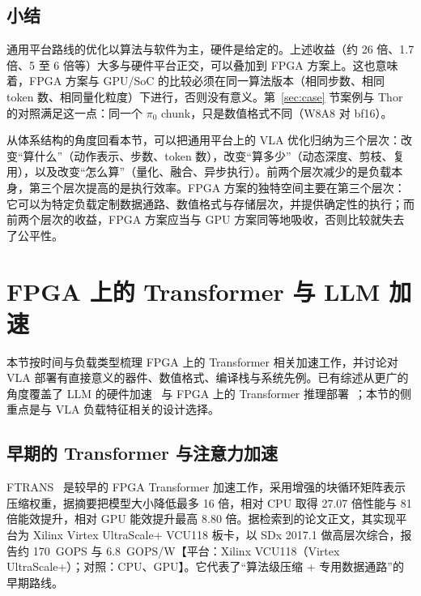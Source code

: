 \documentclass[a4paper,10.5pt]{ctexart}
\newcommand{\pizero}{$\pi_0$}
\newcommand{\hw}[1]{\textsf{【平台：#1】}}
\begin{document}
\subsection{小结}

通用平台路线的优化以算法与软件为主，硬件是给定的。上述收益（约 26 倍、1.7 倍、5 至 6 倍等）大多与硬件平台正交，可以叠加到 FPGA 方案上。这也意味着，FPGA 方案与 GPU/SoC 的比较必须在同一算法版本（相同步数、相同 token 数、相同量化粒度）下进行，否则没有意义。第~\ref{sec:case} 节案例与 Thor 的对照满足这一点：同一个 \pizero{} chunk，只是数值格式不同（W8A8 对 bf16）。

从体系结构的角度回看本节，可以把通用平台上的 VLA 优化归纳为三个层次：改变“算什么”（动作表示、步数、token 数），改变“算多少”（动态深度、剪枝、复用），以及改变“怎么算”（量化、融合、异步执行）。前两个层次减少的是负载本身，第三个层次提高的是执行效率。FPGA 方案的独特空间主要在第三个层次：它可以为特定负载定制数据通路、数值格式与存储层次，并提供确定性的执行；而前两个层次的收益，FPGA 方案应当与 GPU 方案同等地吸收，否则比较就失去了公平性。

\section{FPGA 上的 Transformer 与 LLM 加速}\label{sec:fpga}

本节按时间与负载类型梳理 FPGA 上的 Transformer 相关加速工作，并讨论对 VLA 部署有直接意义的器件、数值格式、编译栈与系统先例。已有综述从更广的角度覆盖了 LLM 的硬件加速~\cite{survey_llmhw,survey_llmhw2} 与 FPGA 上的 Transformer 推理部署~\cite{survey_fpga_tf}；本节的侧重点是与 VLA 负载特征相关的设计选择。

\subsection{早期的 Transformer 与注意力加速}

FTRANS~\cite{ftrans} 是较早的 FPGA Transformer 加速工作，采用增强的块循环矩阵表示压缩权重，据摘要把模型大小降低最多 16 倍，相对 CPU 取得 27.07 倍性能与 81 倍能效提升，相对 GPU 能效提升最高 8.80 倍。据检索到的论文正文，其实现平台为 Xilinx Virtex UltraScale+ VCU118 板卡，以 SDx 2017.1 做高层次综合，报告约 170~GOPS 与 6.8~GOPS/W\hw{Xilinx VCU118（Virtex UltraScale+）；对照：CPU、GPU}。它代表了“算法级压缩 + 专用数据通路”的早期路线。
\end{document}
